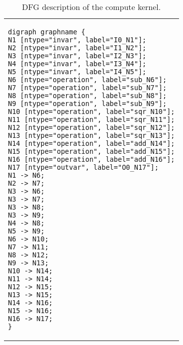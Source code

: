\lstset{framesep=-10pt, xleftmargin=-10pt}

\begin{table}[!h]
	\centering
	\caption{DFG description of the compute kernel.}
	\label{code.tbl}
	\begin{tabular}{l}
		\begin{lstlisting}
digraph graphname {
N1 [ntype="invar", label="I0_N1"];
N2 [ntype="invar", label="I1_N2"];
N3 [ntype="invar", label="I2_N3"];
N4 [ntype="invar", label="I3_N4"];
N5 [ntype="invar", label="I4_N5"];
N6 [ntype="operation", label="sub_N6"];
N7 [ntype="operation", label="sub_N7"];
N8 [ntype="operation", label="sub_N8"];
N9 [ntype="operation", label="sub_N9"];
N10 [ntype="operation", label="sqr_N10"];
N11 [ntype="operation", label="sqr_N11"];
N12 [ntype="operation", label="sqr_N12"];
N13 [ntype="operation", label="sqr_N13"];
N14 [ntype="operation", label="add_N14"];
N15 [ntype="operation", label="add_N15"];
N16 [ntype="operation", label="add_N16"];
N17 [ntype="outvar", label="O0_N17"];
N1 -> N6;
N2 -> N7;
N3 -> N6;
N3 -> N7;
N3 -> N8;
N3 -> N9;
N4 -> N8;
N5 -> N9;
N6 -> N10;
N7 -> N11;
N8 -> N12;
N9 -> N13;
N10 -> N14;
N11 -> N14;
N12 -> N15;
N13 -> N15;
N14 -> N16;
N15 -> N16;
N16 -> N17;
}
		\end{lstlisting}\\
	\end{tabular}
\end{table}
